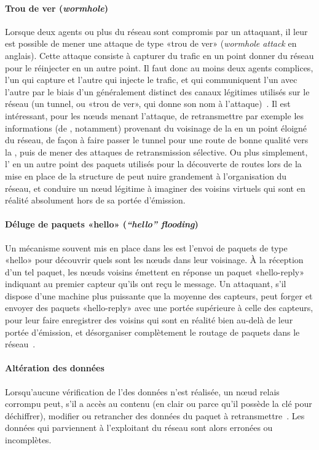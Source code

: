         \paragraph{Trou de ver (\textit{wormhole})}
Lorsque deux agents ou plus du réseau sont compromis par un attaquant, il leur est possible de mener une attaque de type «trou de ver» (\textit{wormhole attack} en anglais).
Cette attaque consiste à capturer du trafic en un point donner du réseau pour le réinjecter en un autre point.
Il faut donc au moins deux agents complices, l'un qui capture et l'autre qui injecte le trafic, et qui communiquent l'un avec l'autre par le biais d'un  généralement distinct des canaux légitimes utilisés sur le réseau (un tunnel, ou «trou de ver», qui donne son nom à l'attaque)~\cite{FZM14}.
Il est intéressant, pour les nœuds menant l'attaque, de retransmettre par exemple les informations (de , notamment) provenant du voisinage de la \sdb en un point éloigné du réseau, de façon à faire passer le tunnel pour une route de bonne qualité vers la \sdb, puis de mener des attaques de retransmission sélective.
Ou plus simplement, l' en un autre point des paquets utilisés pour la découverte de routes lors de la mise en place de la structure de  peut nuire grandement à l'organisation du réseau, et conduire un nœud légitime à imaginer des voisins virtuels qui sont en réalité absolument hors de sa portée d'émission.

        \paragraph{Déluge de paquets «hello» (\textit{“hello” flooding})}
Un mécanisme souvent mis en place dans les \rcs est l'envoi de paquets de type «hello» pour découvrir quels sont les nœuds dans leur voisinage.
À la réception d'un tel paquet, les nœuds voisins émettent en réponse un paquet «hello-reply» indiquant au premier capteur qu'ils ont reçu le message.
Un attaquant, s'il dispose d'une machine plus puissante que la moyenne des capteurs, peut forger et envoyer des paquets «hello-reply» avec une portée supérieure à celle des capteurs, pour leur faire enregistrer des voisins qui sont en réalité bien au-delà de leur portée d'émission, et désorganiser complètement le routage de paquets dans le réseau~\cite{AD14}.

        \paragraph{Altération des données}
Lorsqu'aucune vérification de l'\integrite des données n'est réalisée, un nœud relais corrompu peut, s'il a accès au contenu (en clair ou parce qu'il possède la clé pour déchiffrer), modifier ou retrancher des données du paquet à retransmettre~\cite{SZFDXC14}.
Les données qui parviennent à l'exploitant du réseau sont alors erronées ou incomplètes.

